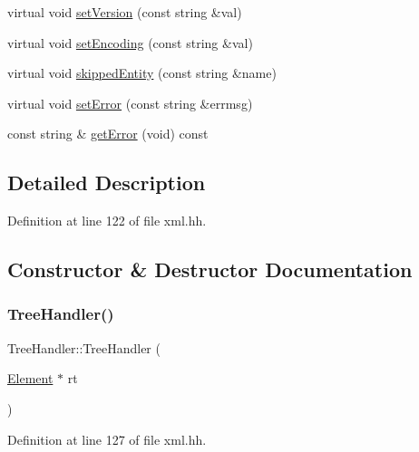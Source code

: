 \begin{DoxyCompactItemize}
\item 
virtual void \mbox{\hyperlink{class_tree_handler_ab16dcd42f1f701b5f892f2d68ff6d4df}{set\+Version}} (const string \&val)
\item 
virtual void \mbox{\hyperlink{class_tree_handler_a9cd7a58c26881b5301d6f0b04f9a1c7f}{set\+Encoding}} (const string \&val)
\item 
virtual void \mbox{\hyperlink{class_tree_handler_a4255e1d0d2663ac73b752ee1c82de371}{skipped\+Entity}} (const string \&name)
\item 
virtual void \mbox{\hyperlink{class_tree_handler_a2e7990443435013045fc5fc5ae363492}{set\+Error}} (const string \&errmsg)
\item 
const string \& \mbox{\hyperlink{class_tree_handler_a38b7b5077f014448ef8e79860bb4095d}{get\+Error}} (void) const
\end{DoxyCompactItemize}


\subsection{Detailed Description}


Definition at line 122 of file xml.\+hh.



\subsection{Constructor \& Destructor Documentation}
\mbox{\label{class_tree_handler_adbeb3ebf438c6dc905063d1f321e0c72}} 
\subsubsection{\texorpdfstring{TreeHandler()}{TreeHandler()}}
{\footnotesize\ttfamily Tree\+Handler\+::\+Tree\+Handler (\begin{DoxyParamCaption}\item[{\mbox{\hyperlink{class_element}{Element}} $\ast$}]{rt }\end{DoxyParamCaption})\hspace{0.3cm}{\ttfamily [inline]}}



Definition at line 127 of file xml.\+hh.

\mbox{\label{class_tree_handler_a8071a1e15bcb2af456ccfce616cc2724}} 
